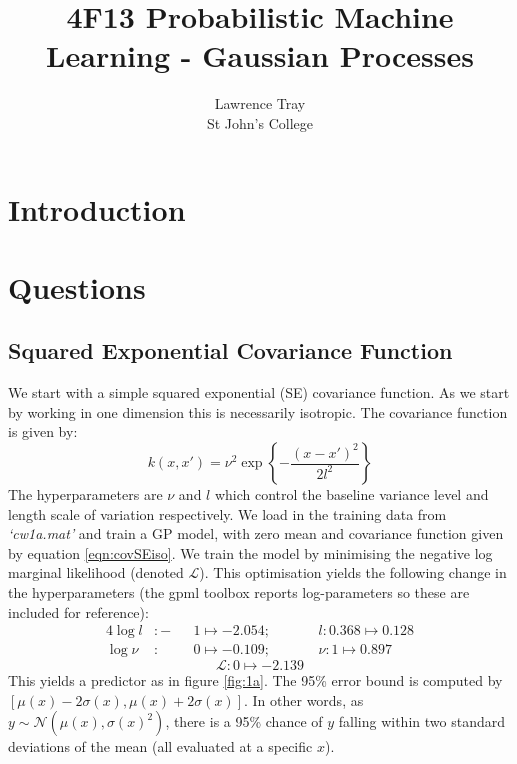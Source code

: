 \documentclass[]{article}
\title{4F13 Probabilistic Machine Learning - Gaussian Processes}
\author{Lawrence Tray \\ St John's College}
\newcommand{\Ncal}{\mathcal{N}}
\newcommand{\Lcal}{\mathcal{L}}
\begin{document}
\maketitle

\begin{abstract}
\end{abstract}

\section{Introduction}

\section{Questions}
\subsection{Squared Exponential Covariance Function}
We start with a simple squared exponential (SE) covariance function. As we start by working in one dimension this is necessarily isotropic. The covariance function is given by:
%
\begin{equation}
k(x, x') = \nu^2 \exp\left\{- \frac{(x-x')^2}{2l^2}\right\}
\label{eqn:covSEiso}
\end{equation}
%
The hyperparameters are $\nu$ and $l$ which control the baseline variance level and length scale of variation respectively. We load in the training data from \textit{`cw1a.mat'} and train a GP model, with zero mean and covariance function given by equation \ref{eqn:covSEiso}. We train the model by minimising the negative log marginal likelihood (denoted $\Lcal$). This optimisation yields the following change in the hyperparameters (the gpml toolbox reports log-parameters so these are included for reference):
%
\begin{alignat}{4}
\log l &: -&&1 \mapsto -2.054 ;\quad &&&l : 0.368 \mapsto 0.128 \\
\log \nu &: &&0 \mapsto -0.109  ;\quad &&&\nu : 1 \mapsto 0.897
\end{alignat}
\begin{equation}
\Lcal: 0 \mapsto -2.139
\end{equation}
%
This yields a predictor as in figure \ref{fig:1a}. The 95\% error bound is computed by $[\mu(x) - 2\sigma(x), \mu(x) + 2\sigma(x)]$. In other words, as $y \sim \Ncal(\mu(x), \sigma(x)^2)$, there is a 95\% chance of $y$ falling within two standard deviations of the mean (all evaluated at a specific $x$).
%
\end{document}
